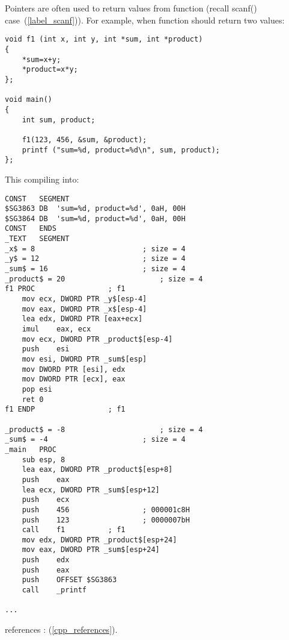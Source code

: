 \section{}
\index{\CLanguageElements!\Pointers}
\label{label_pointers}

{Pointers are often used to return values from function (recall scanf() case~(\ref{label_scanf})).}
{For example, when function should return two values:}

\begin{lstlisting}
void f1 (int x, int y, int *sum, int *product)
{
	*sum=x+y;
	*product=x*y;
};

void main()
{
	int sum, product;

	f1(123, 456, &sum, &product);
	printf ("sum=%d, product=%d\n", sum, product);
};
\end{lstlisting}

{This compiling into:}

\begin{lstlisting}[caption=\Optimizing MSVC 2010]
CONST	SEGMENT
$SG3863	DB	'sum=%d, product=%d', 0aH, 00H
$SG3864	DB	'sum=%d, product=%d', 0aH, 00H
CONST	ENDS
_TEXT	SEGMENT
_x$ = 8							; size = 4
_y$ = 12						; size = 4
_sum$ = 16						; size = 4
_product$ = 20						; size = 4
f1 PROC					; f1
	mov	ecx, DWORD PTR _y$[esp-4]
	mov	eax, DWORD PTR _x$[esp-4]
	lea	edx, DWORD PTR [eax+ecx]
	imul	eax, ecx
	mov	ecx, DWORD PTR _product$[esp-4]
	push	esi
	mov	esi, DWORD PTR _sum$[esp]
	mov	DWORD PTR [esi], edx
	mov	DWORD PTR [ecx], eax
	pop	esi
	ret	0
f1 ENDP					; f1

_product$ = -8						; size = 4
_sum$ = -4						; size = 4
_main	PROC
	sub	esp, 8
	lea	eax, DWORD PTR _product$[esp+8]
	push	eax
	lea	ecx, DWORD PTR _sum$[esp+12]
	push	ecx
	push	456					; 000001c8H
	push	123					; 0000007bH
	call	f1			; f1
	mov	edx, DWORD PTR _product$[esp+24]
	mov	eax, DWORD PTR _sum$[esp+24]
	push	edx
	push	eax
	push	OFFSET $SG3863
	call	_printf

...
\end{lstlisting}

 references \InENRU \Cpp: (\ref{cpp_references}).
